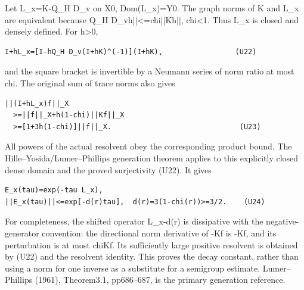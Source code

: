 \documentclass[11pt,a4paper]{article}
\renewcommand{\[}{\begingroup\small\originaldisplaystart}
\renewcommand{\]}{\originaldisplayend\endgroup}
\begin{document}
Let L\_x=K-Q\_H D\_v on X0, Dom(L\_x)=Y0. The graph norms of K and L\_x
are equivalent because \textbar\textbar Q\_H
{D\allowbreak{}\_\allowbreak{}v\allowbreak{}h\allowbreak{}|\allowbreak{}|\allowbreak{}\textless{}\allowbreak{}=\allowbreak{}c\allowbreak{}h\allowbreak{}i\allowbreak{}|\allowbreak{}|\allowbreak{}K\allowbreak{}h\allowbreak{}|\allowbreak{}|\allowbreak{},\allowbreak{}}
chi\textless1. Thus L\_x is closed and densely defined. For
h\textgreater0,

\begin{verbatim}
I+hL_x=[I-hQ_H D_v(I+hK)^(-1)](I+hK),                 (U22)
\end{verbatim}

and the square bracket is invertible by a Neumann series of norm ratio
at most chi. The original sum of trace norms also gives

\begin{verbatim}
||(I+hL_x)f||_X
  >=||f||_X+h(1-chi)||Kf||_X
  >=[1+3h(1-chi)]||f||_X.                              (U23)
\end{verbatim}

All powers of the actual resolvent obey the corresponding product bound.
The
{H\allowbreak{}i\allowbreak{}l\allowbreak{}l\allowbreak{}e\allowbreak{}–\allowbreak{}Y\allowbreak{}o\allowbreak{}s\allowbreak{}i\allowbreak{}d\allowbreak{}a\allowbreak{}/\allowbreak{}L\allowbreak{}u\allowbreak{}m\allowbreak{}e\allowbreak{}r\allowbreak{}–\allowbreak{}P\allowbreak{}h\allowbreak{}i\allowbreak{}l\allowbreak{}l\allowbreak{}i\allowbreak{}p\allowbreak{}s\allowbreak{}}
generation theorem applies to this explicitly closed dense domain and
the proved surjectivity (U22). It gives

\begin{verbatim}
E_x(tau)=exp(-tau L_x),
||E_x(tau)||<=exp[-d(r)tau],  d(r)=3(1-chi(r))>=3/2.    (U24)
\end{verbatim}

For completeness, the shifted operator L\_x-d(r) is dissipative with the
negative-generator convention: the directional norm derivative of -Kf is
-\textbar\textbar Kf\textbar\textbar, and its perturbation is at most
chi\textbar\textbar Kf\textbar\textbar. Its sufficiently large positive
resolvent is obtained by (U22) and the resolvent identity. This proves
the decay constant, rather than using a norm for one inverse as a
substitute for a semigroup estimate. Lumer--Phillips (1961), Theorem3.1,
pp686--687, is the primary generation reference.
\end{document}

